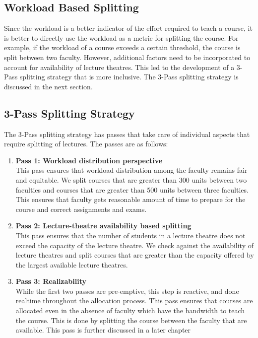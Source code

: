 \subsection{Workload Based Splitting}

Since the workload is a better indicator of the effort required to teach a course, it is better to directly use the workload as a metric for splitting the course. For example, if the workload of a course exceeds a certain threshold, the course is split between two faculty. However, additional factors need to be incorporated to account for availability of lecture theatres. This led to the development of a 3-Pass splitting strategy that is more inclusive. The 3-Pass splitting strategy is discussed in the next section.

\subsection{3-Pass Splitting Strategy}

The 3-Pass splitting strategy has passes that take care of individual aspects that require splitting of lectures. The passes are as follows:

\begin{enumerate}
  \item {
        \textbf{Pass 1: Workload distribution perspective}\\
        This pass ensures that workload distribution among the faculty remains fair and equitable. We split courses that are greater than 300 units between two faculties and courses that are greater than 500 units between three faculties. This ensures that faculty gets reasonable amount of time to prepare for the course and correct assignments and exams.
        }
  \item {
        \textbf{Pass 2: Lecture-theatre availability based splitting}\\
        This pass ensures that the number of students in a lecture theatre does not exceed the capacity of the lecture theatre. We check against the availability of lecture theatres and split courses that are greater than the capacity offered by the largest available lecture theatres.
        }
  \item {
        \textbf{Pass 3: Realizability}\\
        While the first two passes are pre-emptive, this step is reactive, and done realtime throughout the allocation process. This pass ensures that courses are allocated even in the absence of faculty which have the bandwidth to teach the course. This is done by splitting the course between the faculty that are available. This pass is further discussed in a later chapter %
        }
\end{enumerate}
